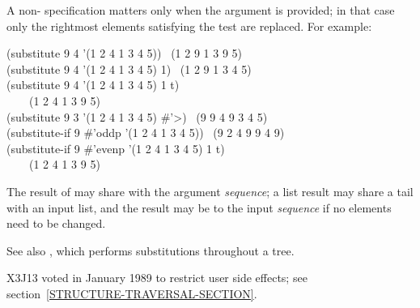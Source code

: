 \begin{defun}[Function]
A non-{\false}  specification
matters only when the  argument
is provided; in that case only the rightmost  elements satisfying
the test are replaced.
For example:
\begin{lisp}
(substitute 9 4 '(1 2 4 1 3 4 5)) \EV\ (1 2 9 1 3 9 5) \\
(substitute 9 4 '(1 2 4 1 3 4 5)  1) \EV\ (1 2 9 1 3 4 5) \\
(substitute 9 4 '(1 2 4 1 3 4 5)  1  t) \\
~~~\EV\ (1 2 4 1 3 9 5) \\
(substitute 9 3 '(1 2 4 1 3 4 5)  \#'>) \EV\ (9 9 4 9 3 4 5) \\
(substitute-if 9 \#'oddp '(1 2 4 1 3 4 5)) \EV\ (9 2 4 9 9 4 9) \\
(substitute-if 9 \#'evenp '(1 2 4 1 3 4 5)  1  t) \\
~~~\EV\ (1 2 4 1 3 9 5)
\end{lisp}
The result of  may share
with the argument {\it sequence}; a list result may share a tail
with an input list, and the result may be  to the input {\it sequence}
if no elements need to be changed.

See also , which performs substitutions throughout a tree.

\begin{new}
X3J13 voted in January 1989
to restrict user side effects; see section~\ref{STRUCTURE-TRAVERSAL-SECTION}.
\end{new}
\end{defun}

